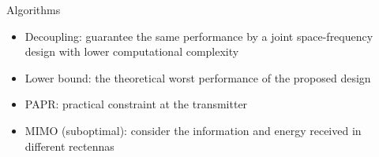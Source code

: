 \documentclass[xcolor={table}]{beamer}
\begin{document}
\begin{frame}[fragile=singleslide,t]
\begin{block}{Algorithms}
\begin{itemize}
  \item Decoupling: guarantee the same performance by a joint space-frequency design with lower computational complexity
  \item Lower bound: the theoretical worst performance of the proposed design
  \item PAPR: practical constraint at the transmitter
  \item MIMO (suboptimal): consider the information and energy received in different rectennas
\end{itemize}
\end{block}




\end{frame}
\end{document}
